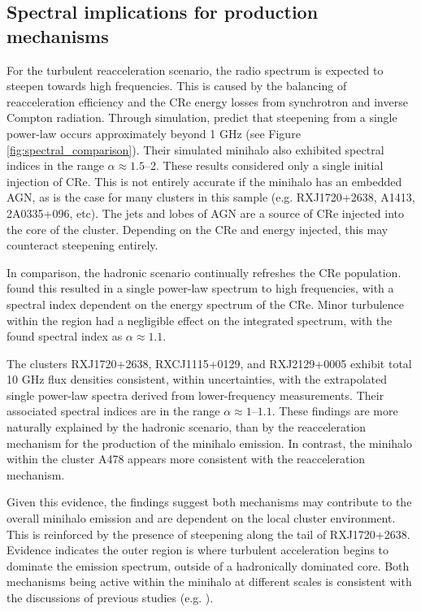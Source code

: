 \subsection{Spectral implications for production mechanisms}

For the turbulent reacceleration scenario, the radio spectrum is expected to steepen towards high frequencies. This is caused by the balancing of reacceleration efficiency and the CRe energy losses from synchrotron and inverse Compton radiation. Through simulation, \citet{ZuHone2013} predict that steepening from a single power-law occurs approximately beyond 1 GHz (see Figure \ref{fig:spectral_comparison}). Their simulated minihalo also exhibited spectral indices in the range $\alpha\approx1.5$--2. These results considered only a single initial injection of CRe. This is not entirely accurate if the minihalo has an embedded AGN, as is the case for many clusters in this sample (e.g. RXJ1720+2638, A1413, 2A0335+096, etc). The jets and lobes of AGN are a source of CRe injected into the core of the cluster. Depending on the CRe and energy injected, this may counteract steepening entirely.

In comparison, the hadronic scenario continually refreshes the CRe population. \citet{ZuHone2015} found this resulted in a single power-law spectrum to high frequencies, with a spectral index dependent on the energy spectrum of the CRe. Minor turbulence within the region had a negligible effect on the integrated spectrum, with the found spectral index as $\alpha\approx1.1$. 

The clusters RXJ1720+2638, RXCJ1115+0129, and RXJ2129+0005 exhibit total 10 GHz flux densities consistent, within uncertainties, with the extrapolated single power-law spectra derived from lower-frequency measurements. Their associated spectral indices are in the range $\alpha\approx1$--$1.1$. These findings are more naturally explained by the hadronic scenario, than by the reacceleration mechanism for the production of the minihalo emission. In contrast, the minihalo within the cluster A478 appears more consistent with the reacceleration mechanism. 

Given this evidence, the findings suggest both mechanisms may contribute to the overall minihalo emission and are dependent on the local cluster environment. This is reinforced by the presence of steepening along the tail of RXJ1720+2638. Evidence indicates the outer region is where turbulent acceleration begins to dominate the emission spectrum, outside of a hadronically dominated core. Both mechanisms being active within the minihalo at different scales is consistent with the discussions of previous studies (e.g. \citealp{Perrott2021,Riseley2024}). 

